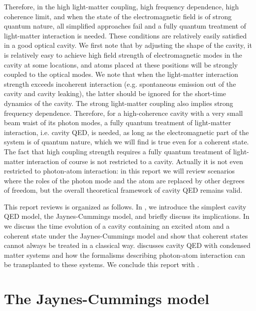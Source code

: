 \documentclass[hyperref, a4paper]{article}
\begin{document}
Therefore, in the high light-matter coupling, high frequency dependence, high coherence limit,
and when the state of the electromagnetic field is of strong quantum nature,
all simplified approaches fail and a fully quantum treatment of light-matter interaction is needed.
These conditions are relatively easily satisfied 
in a good optical cavity.
We first note that by adjusting the shape of the cavity,
it is relatively easy to achieve high field strength of electromagnetic modes in the cavity
at some locations,
and atoms placed at these positions will be strongly coupled to the optical modes.
We note that when the light-matter interaction strength exceeds
incoherent interaction (e.g. spontaneous emission out of the cavity and cavity leaking),
the latter should be ignored for the short-time dynamics of the cavity.
The strong light-matter coupling also implies strong frequency dependence.
Therefore, for a high-coherence cavity with a very small beam waist of its photon modes,
a fully quantum treatment of light-matter interaction, i.e. cavity QED,
is needed, as long as the electromagnetic part of the system is of quantum nature,
which we will find is true even for a coherent state.
The fact that high coupling strength requires a fully quantum treatment of light-matter interaction
of course is not restricted to a cavity.
Actually it is not even restricted to photon-atom interaction:
in this report we will review scenarios where 
the roles of the photon mode and the atom are replaced by other degrees of freedom,
but the overall theoretical framework of cavity QED remains valid.

This report reviews is organized as follows.
In ,
we introduce the simplest cavity QED model,
the Jaynes-Cummings model,
and briefly discuss its implications.
In  
we discuss the time evolution of a cavity 
containing an excited atom and a coherent state under the Jaynes-Cummings model
and show that coherent states cannot always be treated in a classical way.
 discusses cavity QED with condensed matter systems 
and how the formalisms describing photon-atom interaction can be transplanted to these systems. 
We conclude this report with .

\section{The Jaynes-Cummings model}\label{sec:jc}
\end{document}
